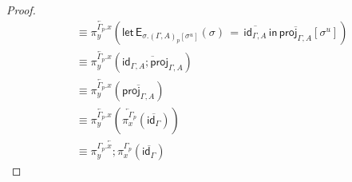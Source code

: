 \documentclass[10pt]{article}
\theoremstyle{definition}
\newcommand{\id}{\mathsf{id}}
\newcommand{\rewrite}[2]{\overleftarrow{#1}(#2)}
\newcommand\EEs[4]{\ensuremath{\mathsf{let} \, \mathsf{E}_{#1}(#3) \, = \, {#2} \, \mathsf{in} \, #4}}
\newcommand\unp[2]{\ensuremath{{#2}^u}}
\newcommand{\modeof}[1]{{#1}_p}
\newcommand{\upstairs}[1]{\overline{#1}}
\newcommand\proj[1]{\ensuremath{\mathsf{proj}_{#1}}}
\begin{document}
\begin{proof}
\begin{align*}
&\equiv \rewrite{\pi^{\modeof{\Gamma}.x}_y}{\EEs{\sigma.\modeof{(\Gamma, A)}[\unp{\Gamma, A}{\sigma}]}{\upstairs{\id_{\Gamma, A}}}{\sigma}{\upstairs{\proj{\Gamma, A}}[\unp{\upstairs{\Gamma, A}}{\sigma}]}} \\
&\equiv \rewrite{\pi^{\modeof{\Gamma}.x}_y}{\upstairs{\id_{\Gamma, A};\proj{\Gamma, A}}} \\
&\equiv \rewrite{\pi^{\modeof{\Gamma}.x}_y}{\upstairs{\proj{\Gamma, A}}} \\
&\equiv \rewrite{\pi^{\modeof{\Gamma}.x}_y}{\rewrite{\pi^{\modeof{\Gamma}}_x}{\upstairs{\id_\Gamma}}} \\
&\equiv \rewrite{\pi^{\modeof{\Gamma}.x}_y;\pi^{\modeof{\Gamma}}_x}{\upstairs{\id_\Gamma}}
\end{align*}
\end{proof}
\end{document}
